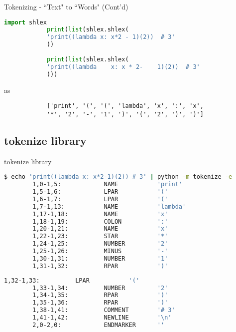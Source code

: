 \begin{frame}[fragile]{Tokenizing - ``Text" to ``Words" (Cont'd)}
    \begin{flushleft}
        \begin{lstlisting}[language=python, keywordstyle=\color{Mulberry}\textbf]
            import shlex
            print(list(shlex.shlex(
            'print((lambda x: x*2 - 1)(2))  # 3'
            ))
            
            print(list(shlex.shlex(
            'print((lambda    x: x * 2-    1)(2))  # 3'
            )))
        \end{lstlisting}
        as
        \begin{lstlisting}
            ['print', '(', '(', 'lambda', 'x', ':', 'x',
            '*', '2', '-', '1', ')', '(', '2', ')', ')']
        \end{lstlisting}
    \end{flushleft}
\end{frame}
\subsection{{\ttfamily tokenize} library}

\begin{frame}[fragile]{{\ttfamily tokenize} library}
    \begin{lstlisting}[language=bash, numbers=none]
        $ echo 'print((lambda x: x*2-1)(2)) # 3' | python -m tokenize -e
        1,0-1,5:            NAME           'print'        
        1,5-1,6:            LPAR           '('            
        1,6-1,7:            LPAR           '('            
        1,7-1,13:           NAME           'lambda'       
        1,17-1,18:          NAME           'x'            
        1,18-1,19:          COLON          ':'            
        1,20-1,21:          NAME           'x'            
        1,22-1,23:          STAR           '*'            
        1,24-1,25:          NUMBER         '2'            
        1,25-1,26:          MINUS          '-'            
        1,30-1,31:          NUMBER         '1'            
        1,31-1,32:          RPAR           ')'            
    \end{lstlisting}
\end{frame}

\begin{frame}[fragile]
    \begin{lstlisting}[language=bash, numbers=none]
        1,32-1,33:          LPAR           '('            
        1,33-1,34:          NUMBER         '2'            
        1,34-1,35:          RPAR           ')'            
        1,35-1,36:          RPAR           ')'            
        1,38-1,41:          COMMENT        '# 3'          
        1,41-1,42:          NEWLINE        '\n'           
        2,0-2,0:            ENDMARKER      ''   
    \end{lstlisting}
\end{frame}
